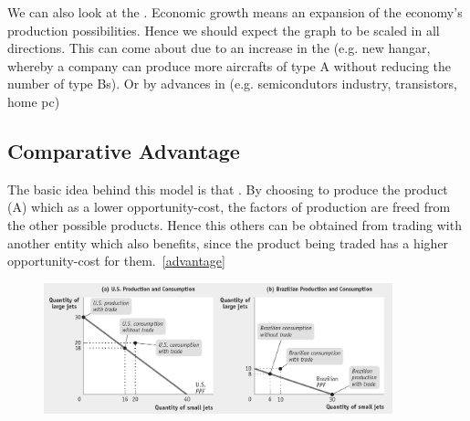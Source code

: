 \documentclass[english,course,draft]{Notes}
\begin{document}
\par{We can also look at the . Economic growth means an expansion of the economy's production possibilities. Hence we should expect the graph to be scaled in all directions. This can come about due to an increase in the  (e.g. new hangar, whereby a company can produce more aircrafts of type A without reducing the number of type Bs). Or by advances in (e.g. semicondutors industry, transistors, home pc)}



\subsection{Comparative Advantage}

\par{The basic idea behind this model is that . By choosing to produce the product (A) which as a lower opportunity-cost, the factors of production are freed from the other possible products. Hence this others can be obtained from trading with another entity which also benefits, since the product being traded has a higher opportunity-cost for them.~\ref{advantage}}


\begin{figure}[ht]
\centering
\includegraphics[width=0.9\textwidth]{jetsTrade.png}
\end{figure}


\end{document}
